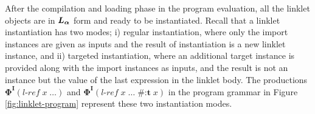 \documentclass[sigplan,screen,anonymous]{acmart}
\def\dash {\text{-}}
\begin{document}
After the compilation and loading phase in the program evaluation, all
the linklet objects are in $\bm{L_\alpha}$ form and ready to be
instantiated. Recall that a linklet instantiation has two modes; i)
regular instantiation, where only the import instances are given as
inputs and the result of instantiation is a new linklet instance, and
ii) targeted instantiation, where an additional target instance is
provided along with the import instances as inputs, and the result is
not an instance but the value of the last expression in the linklet
body. The productions $\bm{\Phi^I}(l\dash ref\; x\; \ldots)$ and
$\bm{\Phi^I}(l\dash ref\; x\; \ldots\; \textbf{\#:t}\; x)$ in the program
grammar in Figure \ref{fig:linklet-program} represent these two
instantiation modes.


\newcommand{\redinput}[1]{EP\;\llbracket #1 \rrbracket, \rho, \sigma\;}
\newcommand{\redoutput}[3]{EP\;\llbracket #1 \rrbracket, #2, #3\;}

\newcommand{\rcinput}[1]{EP\;\llbracket E\;\llbracket #1 \rrbracket \rrbracket, \rho, \sigma\;}
\newcommand{\rcoutput}[3]{EP\;\llbracket E\;\llbracket #1 \rrbracket \rrbracket, #2, #3\;}
\def\rcrel {&\longrightarrow_{\beta r}\;}

\def\where {\textbf{where}\;}
\def\rel {&\longrightarrow_{\beta p}\;}
\end{document}
